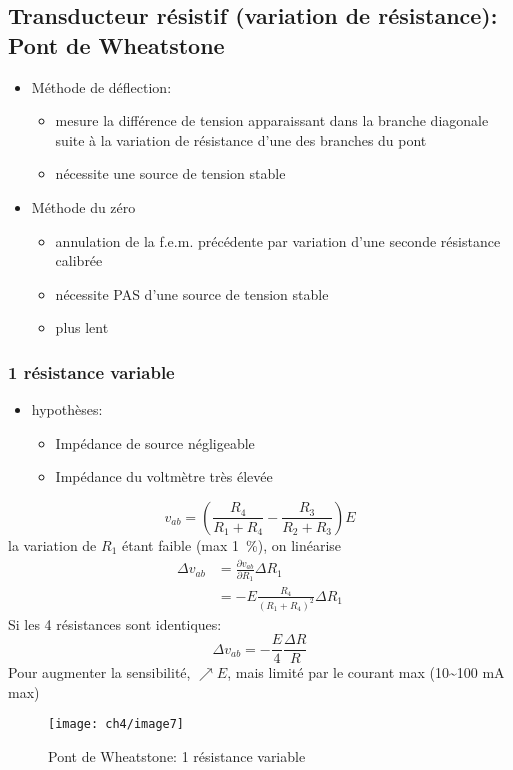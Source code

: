 \subsection{Transducteur résistif (variation de résistance): Pont de Wheatstone}
	\begin{itemize}
		\item Méthode de déflection:
		\begin{itemize}
			\item mesure la différence de tension apparaissant dans la branche diagonale suite à la variation de résistance d'une des branches du pont
			\item nécessite une source de tension stable
		\end{itemize}
		\item Méthode du zéro
		\begin{itemize}
			\item annulation de la f.e.m. précédente par variation d'une seconde résistance calibrée
			\item nécessite PAS d'une source de tension stable
			\item plus lent
		\end{itemize}
	\end{itemize}
\subsubsection{1 résistance variable}
\begin{minipage}[t]{0.8\textwidth}
	\begin{itemize}
		\item hypothèses:
		\begin{itemize}
			\item Impédance de source négligeable
			\item Impédance du voltmètre très élevée
		\end{itemize}
	\end{itemize}
	\[v_{ab} = \left(\frac{R_4}{R_1+R_4}-\frac{R_3}{R_2+R_3}\right)E\]
	la variation de \(R_1\) étant faible (max \SI{1}{\percent}), on linéarise
	\begin{align*}
		\Delta v_{ab} &= \frac{\partial v_{ab}}{\partial R_1}\Delta R_1\\
		&= -E\frac{R_4}{(R_1+R_4)^2}\Delta R_1
	\end{align*}
	Si les 4 résistances sont identiques:
	\[\Delta v_{ab} = -\frac{E}{4}\frac{\Delta R}{R}\]
	Pour augmenter la sensibilité, \(\nearrow E\), mais limité par le courant max (10\textasciitilde100 \si{\milli\ampere} max)
\end{minipage}\begin{minipage}[t]{0.2\textwidth}
\begin{figure}[H] 
	\centering 
	\texttt{[image: ch4/image7]} 
	\caption{Pont de Wheatstone: 1 résistance variable} 
\end{figure}
\end{minipage}
